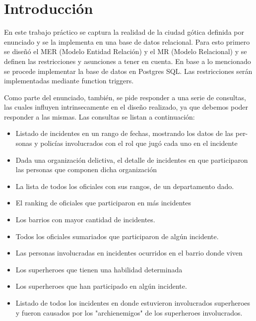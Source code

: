 \section{Introducción}

En este trabajo práctico se captura la realidad de la ciudad gótica definida por enunciado y se la implementa en una base de datos relacional. Para esto primero se diseñó el MER (Modelo Entidad Relación) y el MR (Modelo Relacional) y se definen las restricciones y asunciones a tener en cuenta. En base a lo mencionado se procede implementar la base de datos en Postgres SQL. Las restricciones serán implementadas mediante function triggers.

Como parte del enunciado, también, se pide responder a una serie de consultas, las cuales influyen intrinsecamente en el diseño realizado, ya que debemos poder responder a las mismas. Las consultas se listan a continuación:

\begin{itemize}
\item Listado de incidentes en un rango de fechas, mostrando los datos de las per-
sonas y policías involucrados con el rol que jugó cada uno en el incidente
\item  Dada una organización delictiva, el detalle de incidentes en que participaron
las personas que componen dicha organización
\item  La lista de todos los oficiales con sus rangos, de un departamento dado.
\item  El ranking de oficiales que participaron en más incidentes
\item  Los barrios con mayor cantidad de incidentes.
\item  Todos los oficiales sumariados que participaron de algún incidente.
\item  Las personas involucradas en incidentes ocurridos en el barrio donde viven
\item  Los superheroes que tienen una habilidad determinada
\item  Los superheroes que han participado en algún incidente.
\item  Listado de todos los incidentes en donde estuvieron involucrados superheroes
y fueron causados por los "archienemigos" de los superheroes involucrados.
\end{itemize}